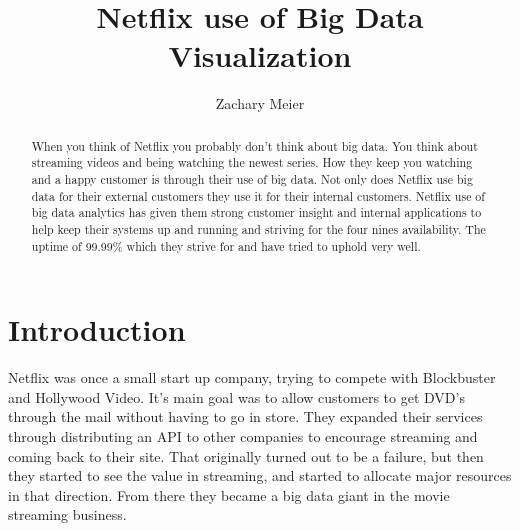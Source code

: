 \documentclass[sigconf]{acmart}
\begin{document}
\title{Netflix use of Big Data Visualization}
\author{Zachary Meier}
\renewcommand{\shortauthors}{Z. Meier et al.}
\begin{abstract}
When you think of Netflix you probably don't think about big data.  You think about streaming videos and being watching the newest series.  How they keep you watching and a happy customer is through their use of big data.  Not only does Netflix use big data for their external customers they use it for their internal customers.  Netflix use of big data analytics has given them strong customer insight and internal applications to help keep their systems up and running and striving for the four nines availability.  The uptime of 99.99\% which they strive for and have tried to uphold very well.
\end{abstract}
\maketitle
\section{Introduction}
Netflix was once a small start up company, trying to compete with Blockbuster and Hollywood Video.  It's main goal was to allow customers to get DVD's through the mail without having to go in store.  They expanded their services through distributing an API to other companies to encourage streaming and coming back to their site.  That originally turned out to be a failure, but then they started to see the value in streaming, and started to allocate major resources in that direction.  From there they became a big data giant in the movie streaming business.
\end{document}
